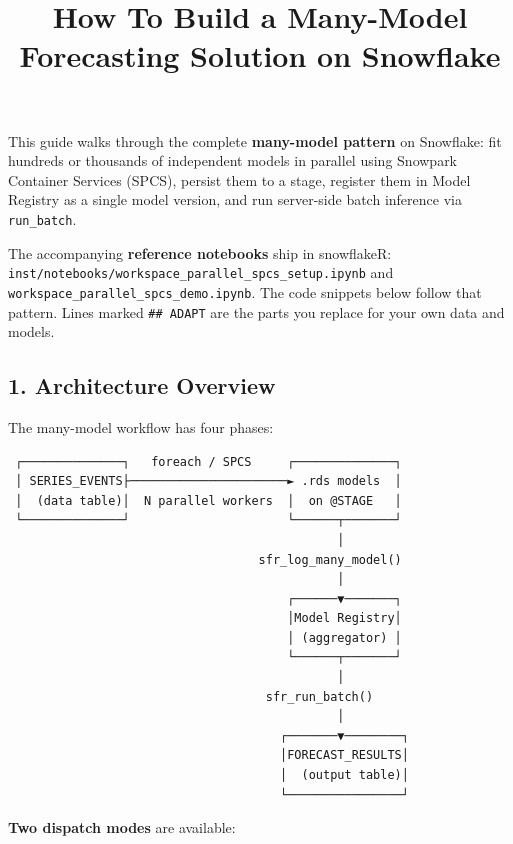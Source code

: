 \documentclass[
]{article}
\title{How To Build a Many-Model Forecasting Solution on Snowflake}
\author{}
\date{\vspace{-2.5em}}
\begin{document}
\maketitle

This guide walks through the complete \textbf{many-model pattern} on
Snowflake: fit hundreds or thousands of independent models in parallel
using Snowpark Container Services (SPCS), persist them to a stage,
register them in Model Registry as a single model version, and run
server-side batch inference via \texttt{run\_batch}.

The accompanying \textbf{reference notebooks} ship in snowflakeR:
\texttt{inst/notebooks/workspace\_parallel\_spcs\_setup.ipynb} and
\texttt{workspace\_parallel\_spcs\_demo.ipynb}. The code snippets below
follow that pattern. Lines marked \texttt{\#\#\ ADAPT} are the parts you
replace for your own data and models.

\subsection{1. Architecture Overview}\label{architecture-overview}

The many-model workflow has four phases:

\begin{verbatim}
 ┌──────────────┐   foreach / SPCS     ┌──────────────┐
 │ SERIES_EVENTS├──────────────────────► .rds models  │
 │  (data table)│  N parallel workers  │  on @STAGE   │
 └──────────────┘                      └──────┬───────┘
                                              │
                                   sfr_log_many_model()
                                              │
                                       ┌──────▼───────┐
                                       │Model Registry│
                                       │ (aggregator) │
                                       └──────┬───────┘
                                              │
                                    sfr_run_batch()
                                              │
                                      ┌───────▼────────┐
                                      │FORECAST_RESULTS│
                                      │  (output table)│
                                      └────────────────┘
\end{verbatim}

\textbf{Two dispatch modes} are available:
\end{document}
